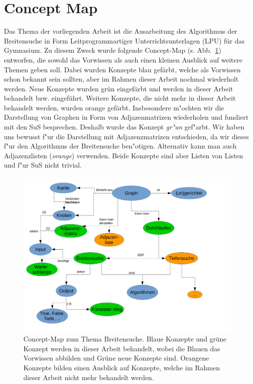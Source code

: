 \section{Concept Map}

Das Thema der vorliegenden Arbeit ist die Ausarbeitung des Algorithmus der Breitensuche in Form Leitprogrammartiger Unterrichtsunterlagen (LPU) für das Gymnasium.  
Zu diesem Zweck wurde folgende Concept-Map (s. Abb.~\ref{fig:cmap}) entworfen, die sowohl das Vorwissen als auch einen kleinen Ausblick auf weitere Themen geben soll.
Dabei wurden Konzepte blau gefärbt, welche als Vorwissen schon bekannt sein sollten, aber im Rahmen dieser Arbeit nochmal wiederholt werden. 
Neue Konzepte wurden grün eingefärbt und werden in dieser Arbeit behandelt bzw. eingeführt.
Weitere Konzepte, die nicht mehr in dieser Arbeit behandelt werden, wurden orange gefärbt. 
Insbesondere m"ochten wir die Darstellung von Graphen in Form von Adjazenmatrizen wiederholen und fundiert mit den SuS besprechen. 
Deshalb wurde das Konzept \emph{gr"un} gef"arbt. 
Wir haben uns bewusst f"ur die Darstellung mit Adjazenzmatrizen entschieden, da wir dieses f"ur den Algorithmus der Breitensuche ben"otigen. 
Alternativ kann man auch Adjazenzlisten (\emph{orange}) verwenden.
Beide Konzepte sind aber Listen von Listen und f"ur SuS nicht trivial.

\begin{figure}[htb]
\begin{center}
\includegraphics[width=.99\textwidth]{../cmap/bsuche_cmap.pdf}
\caption{Concept-Map zum Thema Breitensuche.
Blaue Konzepte und grüne Konzept werden in dieser Arbeit behandelt, wobei die Blauen das Vorwissen abbilden und Grüne neue Konzepte sind. 
Orangene Konzepte bilden einen Ausblick auf Konzepte, welche im Rahmen dieser Arbeit nicht mehr behandelt werden. 
}
\label{fig:cmap}
\end{center}
\end{figure}

